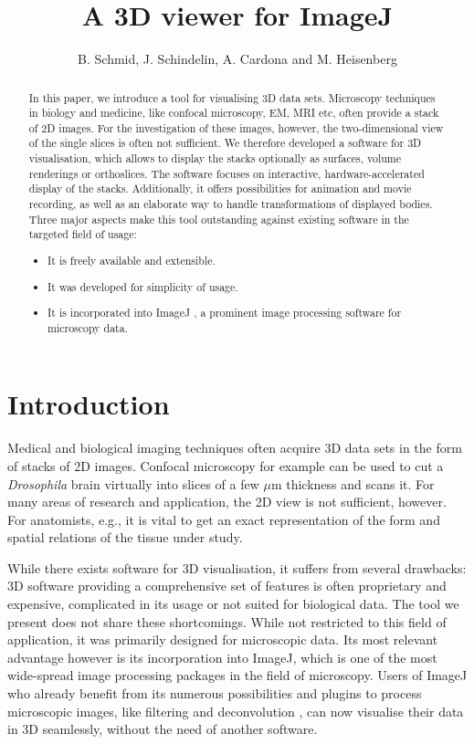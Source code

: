 \documentclass[a4paper,10pt]{article}
\title{A 3D viewer for ImageJ}
\author{B. Schmid, J. Schindelin, A. Cardona and M. Heisenberg}
\begin{document}
\maketitle
\setlength{\parskip}{0.3cm}


\begin{abstract}
In this paper, we introduce a tool for visualising 3D data sets. Microscopy techniques in biology and medicine, like confocal microscopy, EM, MRI etc, often provide a stack of 2D images. For the investigation of these images, however, the two-dimensional view of the single slices is often not sufficient. We therefore developed a software for 3D visualisation, which allows to display the stacks optionally as surfaces, volume renderings or orthoslices. The software focuses on interactive, hardware-accelerated display of the stacks. Additionally, it offers possibilities for animation and movie recording, as well as an elaborate way to handle transformations of displayed bodies.
Three major aspects make this tool outstanding against existing software in the targeted field of usage:
\begin{itemize}
\item It is freely available and extensible.
\item It was developed for simplicity of usage.
\item It is incorporated into ImageJ \cite{imagej}, a prominent image processing software for microscopy data.
\end{itemize}
\end{abstract}




\section{Introduction}
Medical and biological imaging techniques often acquire 3D data sets in the form of stacks of 2D images. Confocal microscopy for example can be used to cut a \textit{Drosophila} brain virtually into slices of a few $\mu$m thickness and scans it. For many areas of research and application, the 2D view is not sufficient, however. For anatomists, e.g., it is vital to get an exact representation of the form and spatial relations of the tissue under study.

While there exists software for 3D visualisation, it suffers from several drawbacks: 3D software providing a comprehensive set of features is often proprietary and expensive, complicated in its usage or not suited for biological data. The tool we present does not share these shortcomings. While not restricted to this field of application, it was primarily designed for microscopic data. Its most relevant advantage however is its incorporation into ImageJ, which is one of the most wide-spread image processing packages in the field of microscopy. Users of ImageJ who already benefit from its numerous possibilities and plugins to process microscopic images, like filtering and deconvolution \cite{mbf}, can now visualise their data in 3D seamlessly, without the need of another software.
\end{document}
